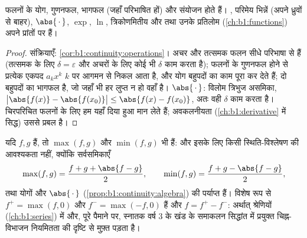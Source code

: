 \begin{proposition}\label{prop:b1:continuity:algebra}
 फलनों के योग, गुणनफल, भागफल (जहाँ परिभाषित हों) और संयोजन  होते
हैं। , परिमेय भिन्नें (अपने ध्रुवों से बाहर), $\abs{\,\cdot\,}$,
$\exp$, $\ln$, त्रिकोणमितीय और  तथा उनके प्रतिलोम
(\cref{ch:b1:functions}) अपने प्रांतों पर  हैं।
\end{proposition}

\begin{proof}
संक्रियाएँ: \cref{cor:b1:continuity:operations}। अचर और तत्समक फलन सीधे
परिभाषा से  हैं (तत्समक के लिए $\delta = \varepsilon$ और अचरों के लिए
कोई भी $\delta$ काम करता है);  फलनों के गुणनफल  होने से प्रत्येक
एकपद $a_k x^k$ $k$ पर आगमन से निकल आता है, और योग बहुपदों का काम पूरा कर
देते हैं;  दो बहुपदों का भागफल है, जो जहाँ भी हर लुप्त न हो वहाँ
 है। $\abs{\,\cdot\,}$: विलोम त्रिभुज असमिका, $\bigl|\abs{f(x)} -
\abs{f(x_0)}\bigr| \leq \abs{f(x) - f(x_0)}$, अतः वही $\delta$ काम करता है।
चिरपरिचित फलनों के लिए हम  यहाँ दिया हुआ मान लेते हैं; अवकलनीयता
(\cref{ch:b1:derivative} में सिद्ध) उससे प्रबल है।
\end{proof}

\begin{example}\label{ex:b1:continuity:maxmin}
यदि $f, g$  हैं, तो $\max(f, g)$ और $\min(f, g)$ भी  हैं: और इसके
लिए किसी स्थिति-विश्लेषण की आवश्यकता नहीं, क्योंकि सर्वसमिकाएँ
\[
\max(f, g) = \frac{f + g + \abs{f - g}}{2},
\qquad
\min(f, g) = \frac{f + g - \abs{f - g}}{2},
\]
तथा योगों और $\abs{\,\cdot\,}$ (\cref{prop:b1:continuity:algebra}) की
 पर्याप्त हैं। विशेष रूप से $f^+ = \max(f, 0)$ और $f^- = \max(-f, 0)$
 हैं और $f = f^+ - f^-$: अर्थात् श्रेणियों (\cref{ch:b1:series}) में और,
पूरे पैमाने पर, स्नातक वर्ष 3 के खंड के समाकलन सिद्धांत में प्रयुक्त
चिह्न-विभाजन नियमितता की दृष्टि से मुफ़्त पड़ता है।
\end{example}


